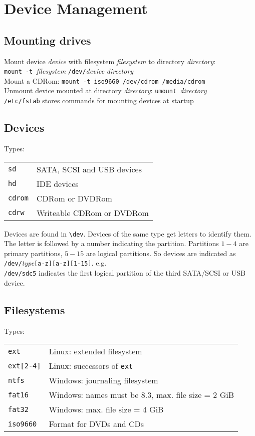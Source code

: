 \section{Device Management}
\subsection{Mounting drives}

Mount device \textit{device} with filesystem \textit{filesystem} to directory \textit{directory}:\\
\verb!mount -t !\textit{filesystem }\verb!/dev/!\textit{device} \textit{directory}	\\
Mount a CDRom: \verb!mount -t iso9660 /dev/cdrom /media/cdrom! \\
Unmount device mounted at directory \textit{directory}:	\verb!umount !\textit{directory} \\
\verb!/etc/fstab! stores commands for mounting devices at startup\\

\subsection{Devices}
Types:\\
\begin{tabular}{@{}p{\the\MyLen}%
				@{}p{\linewidth-\the\MyLen}}
	\verb!sd!		& SATA, SCSI and USB devices\\
	\verb!hd! 		& IDE devices\\
	\verb!cdrom!	& CDRom or DVDRom\\
	\verb!cdrw!		& Writeable CDRom or DVDRom\\
\end{tabular}
Devices are found in \verb!\dev!. Devices of the same type get letters to identify them. The letter is followed by a number indicating the partition. Partitions $1-4$ are primary partitions, $5-15$ are logical partitions.
So devices are indicated as \verb!/dev/!\textit{type}\verb![a-z][a-z][1-15]!.
e.g.\\
\verb!/dev/sdc5! indicates the first logical partition of the third SATA/SCSI or USB device.

\subsection{Filesystems}
Types:\\
\begin{tabular}{@{}p{\the\MyLen}%
				@{}p{\linewidth-\the\MyLen}}
	\verb!ext!			& Linux: extended filesystem\\
	\verb!ext[2-4]! 	& Linux: successors of \verb!ext!\\
	\verb!ntfs!			& Windows: journaling filesystem\\
	\verb!fat16!		& Windows: names must be 8.3, max. file size = 2 GiB\\
	\verb!fat32!		& Windows: max. file size = 4 GiB\\
	\verb!iso9660!		& Format for DVDs and CDs\\
\end{tabular}


